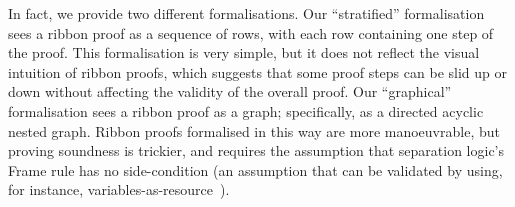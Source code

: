 \documentclass[11pt,a4paper]{article}
\begin{document}
In fact, we provide two different formalisations. Our ``stratified'' formalisation sees a ribbon proof as a sequence of rows, with each row containing one step of the proof. This formalisation is very simple, but it does not reflect the visual intuition of ribbon proofs, which suggests that some proof steps can be slid up or down without affecting the validity of the overall proof. Our ``graphical'' formalisation sees a ribbon proof as a graph; specifically, as a directed acyclic nested graph. Ribbon proofs formalised in this way are more manoeuvrable, but proving soundness is trickier, and requires the assumption that separation logic's Frame rule has no side-condition (an assumption that can be validated by using, for instance, variables-as-resource~\cite{bornat+06}).









\end{document}
